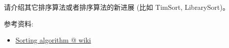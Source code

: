 \documentclass[a4paper, justified]{tufte-handout}
\begin{document}
\begin{ot}

  请介绍其它排序算法或者排序算法的新进展 (比如 TimSort, LibrarySort)。

  \noindent 参考资料:
  \begin{itemize}
    \item \href{https://en.wikipedia.org/wiki/Sorting\_algorithm}{Sorting algorithm @ wiki}
  \end{itemize}
\end{ot}




\beginfb

% 
% 
\end{document}
